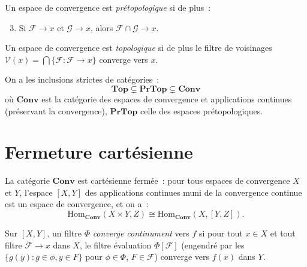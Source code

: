 \begin{definition}
Un espace de convergence est \emph{pr\'etopologique} si de plus~:
\begin{enumerate}
  \setcounter{enumi}{2}
  \item Si $\mathcal{F} \to x$ et $\mathcal{G} \to x$, alors
    $\mathcal{F} \cap \mathcal{G} \to x$.
\end{enumerate}
\end{definition}

\begin{definition}
Un espace de convergence est \emph{topologique} si de plus le filtre de voisinages
$\mathcal{V}(x) = \bigcap\{\mathcal{F} : \mathcal{F} \to x\}$ converge vers $x$.
\end{definition}

\begin{theoreme}[Hi\'erarchie]
On a les inclusions strictes de cat\'egories~:
\[
  \mathbf{Top} \subsetneq \mathbf{PrTop} \subsetneq \mathbf{Conv}
\]
o\`u $\mathbf{Conv}$ est la cat\'egorie des espaces de convergence et applications
continues (pr\'eservant la convergence), $\mathbf{PrTop}$ celle des espaces
pr\'etopologiques.
\end{theoreme}

\section{Fermeture cart\'esienne}

\begin{theoreme}
La cat\'egorie $\mathbf{Conv}$ est cart\'esienne ferm\'ee~: pour tous espaces de convergence
$X$ et $Y$, l'espace $[X,Y]$ des applications continues muni de la convergence continue
est un espace de convergence, et on a~:
\[
  \mathrm{Hom}_{\mathbf{Conv}}(X \times Y, Z) \cong
  \mathrm{Hom}_{\mathbf{Conv}}(X, [Y, Z]).
\]
\end{theoreme}

\begin{definition}
Sur $[X,Y]$, un filtre $\Phi$ \emph{converge continument} vers $f$ si pour tout $x \in X$
et tout filtre $\mathcal{F} \to x$ dans $X$, le filtre \'evaluation $\Phi[\mathcal{F}]$
(engendr\'e par les $\{g(y) : g \in \phi, y \in F\}$ pour $\phi \in \Phi$,
$F \in \mathcal{F}$) converge vers $f(x)$ dans $Y$.
\end{definition}

